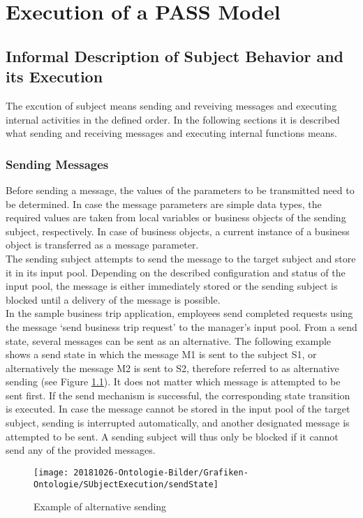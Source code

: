 \chapter{Execution of a PASS Model}
\label{PASSExec}

\section{Informal Description of Subject Behavior and its Execution}
The excution of subject means sending and reveiving messages and executing internal activities in the defined order. In the following sections it is described what sending and receiving messages and executing internal functions means.

\subsection{Sending Messages}
Before sending a message, the values of the parameters to be transmitted need to be determined. In case the message parameters are simple data types, the required values are taken from local variables or business objects of the sending subject, respectively. In case of business objects, a current instance of a business object is transferred as a message parameter.\\
The sending subject attempts to send the message to the target subject and store it in its input pool. Depending on the described configuration and status of the input pool, the message is either immediately stored or the sending subject is blocked until a delivery of the message is possible.\\
In the sample business trip application, employees send completed requests using the message ‘send business trip request’ to the manager’s input pool. From a send state, several messages can be sent as an alternative. The following example shows a send state in which the message M1 is sent to the subject S1, or alternatively the message M2 is sent to S2, therefore referred to as alternative sending (see Figure \ref{fig:sendstate}). It does not matter which message is attempted to be sent first. If the send mechanism is successful, the corresponding state transition is executed. In case the message cannot be stored in the input pool of the target subject, sending is interrupted automatically, and another designated message is attempted to be sent. A sending subject will thus only be blocked if it cannot send any of the provided messages.

\begin{figure}[ph]
	\centering
	\texttt{[image: 20181026-Ontologie-Bilder/Grafiken-Ontologie/SUbjectExecution/sendState]}
	\caption[Example of alternative sending]{Example of alternative sending}
	\label{fig:sendstate}
\end{figure}


